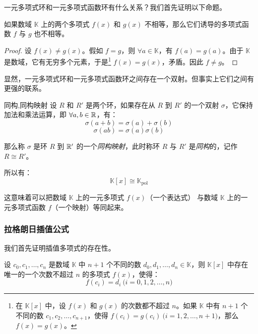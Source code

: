 一元多项式环和一元多项式函数环有什么关系？我们首先证明以下命题。

\begin{proposition}
	如果数域 $\mathbb K$ 上的两个多项式 $f(x)$ 和 $g(x)$ 不相等，那么它们诱导的多项式函数 $f$ 与 $g$ 也不相等。
\end{proposition}

\begin{proof}
	设 $f(x) \ne g(x)$。假如 $f = g$，则 $\forall a \in \mathbb K$，有 $f(a) = g(a)$。由于 $\mathbb K$ 是数域，它有无穷多个元素，于是\footnote{在 $\mathbb K[x]$ 中，设 $f(x)$ 和 $g(x)$ 的次数都不超过 $n$。如果 $\mathbb K$ 中有 $n + 1$ 个不同的数 $c_1, c_2, \ldots, c_{n + 1}$，使得 $f(c_i) = g(c_i) \pod{i = 1, 2, \ldots, n + 1}$，那么 $f(x) = g(x)$。} $f(x) = g(x)$，矛盾。因此 $f \ne g$。
\end{proof}

显然，一元多项式环和一元多项式函数环之间存在一个双射。但事实上它们之间有更强的联系。

\begin{definition}{同构,同构映射}
	设 $R$ 和 $R'$ 是两个环，如果存在从 $R$ 到 $R'$ 的一个双射 $\sigma$，它保持加法和乘法运算，即 $\forall a, b \in \mathbb R$，有：
	$$
	\sigma(a + b) = \sigma(a) + \sigma(b)
	$$$$
	\sigma(ab) = \sigma(a) \sigma(b)
	$$

	那么称 $\sigma$ 是环 $R$ 到 $\mathbb R'$ 的一个\emph{同构映射}，此时称环 $R$ 与 $R'$ 是\emph{同构}的，记作 $R \cong R'$。
\end{definition}

所以有：
$$
\mathbb K[x] \cong \mathbb K_\mathrm{pol}
$$

这意味着可以把数域 $\mathbb K$ 上的一元多项式 $f(x)$（一个表达式） 与数域 $\mathbb K$ 上的一元多项式函数 $f$（一个映射）等同起来。

\subsubsection{拉格朗日插值公式}

我们首先证明插值多项式的存在性。

\begin{theorem}
	设 $c_0, c_1, \ldots, c_n$ 是数域 $\mathbb K$ 中 $n + 1$ 个不同的数 $d_0, d_1, \ldots, d_n \in \mathbb K$，则 $\mathbb K[x]$ 中存在唯一的一个次数不超过 $n$ 的多项式 $f(x)$，使得：
	$$
	f(c_i) = d_i \pod{i = 0, 1, 2, \ldots, n}
	$$
\end{theorem}

